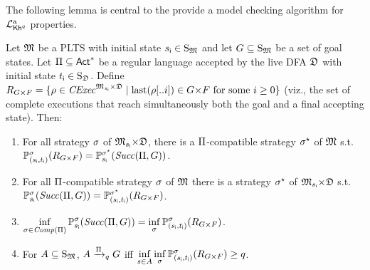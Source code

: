 The following lemma is central to the provide a model checking
algorithm for ${\mathcal{L}^{\mathrm{a}}_{{\mathsf{Kh}}^q}}$ properties.

\begin{lemma}\label{lm:mc:core}
  Let ${\mathfrak{M}}$ be a PLTS with initial state ${s_{\textsf{i}}}\in\operatorname{S}_{\mathfrak{M}}$ and
  let $G\subseteq\operatorname{S}_{\mathfrak{M}}$ be a set of goal states.
  Let $\Pi\subseteq{\rm \sf Act}^*$ be a regular language accepted by the
  live DFA ${\mathfrak{D}}$ with initial state ${t_{\textsf{i}}}\in\operatorname{S}_{\mathfrak{D}}$.  Define
  $R_{G{\times}F} = \{{\rho\in\mathit{CExec}^{{\mathfrak{M}}_{{s_{\textsf{i}}}}{\times}{\mathfrak{D}}}} \mid \mathrm{last}(\rho[..i])\in{G{\times}F} \text{ for some }{i\geq 0}\}$
  (viz., the set of complete executions that reach simultaneously both
  the goal and a final accepting state).
  Then:
  \begin{enumerate}
  \item\label{lm:mc:core:i}%
    For all strategy $\sigma$ of ${\mathfrak{M}}_{{s_{\textsf{i}}}}{\times}{\mathfrak{D}}$, there is
    a $\Pi$-compatible strategy $\sigma^\star$ of ${\mathfrak{M}}$ s.t.\
    $\mathbb{P}^{\sigma}_{({s_{\textsf{i}}},{t_{\textsf{i}}})}(R_{G{\times}F}) = \mathbb{P}^{\sigma^\star}_{{s_{\textsf{i}}}}(\mathit{Succ}(\Pi,G))$.
  \item\label{lm:mc:core:ii}%
    For all $\Pi$-compatible strategy $\sigma$ of ${\mathfrak{M}}$
    there is a strategy $\sigma^\star$ of ${\mathfrak{M}}_{{s_{\textsf{i}}}}{\times}{\mathfrak{D}}$ s.t.\
    $\mathbb{P}^{\sigma}_{{s_{\textsf{i}}}}(\mathit{Succ}(\Pi,G)) = \mathbb{P}^{\sigma^\star}_{({s_{\textsf{i}}},{t_{\textsf{i}}})}(R_{G{\times}F})$.
  \item\label{lm:mc:core:iii}%
    $\displaystyle\inf_{\sigma\in\mathit{Comp}(\Pi)}\mathbb{P}^{\sigma}_{{s_{\textsf{i}}}}(\mathit{Succ}(\Pi,G)) = \inf_{\sigma}\mathbb{P}^{\sigma}_{({s_{\textsf{i}}},{t_{\textsf{i}}})}(R_{G{\times}F})$.
  \item\label{lm:mc:core:iv}%
    For $A\subseteq\operatorname{S}_{\mathfrak{M}}$, $A\xrightarrow{\Pi}_qG$ iff
    $\displaystyle\inf_{s\in A}\inf_{\sigma}\mathbb{P}^{\sigma}_{({s_{\textsf{i}}},{t_{\textsf{i}}})}(R_{G{\times}F})\geq q$.
  \end{enumerate}
\end{lemma}
%
